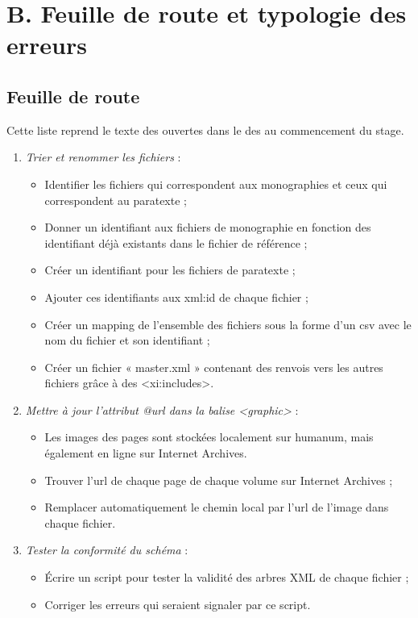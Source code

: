 \renewcommand{\thesection}{B.1}
\chapter{B. Feuille de route et typologie des erreurs}

\section{Feuille de route}
\label{ann:feuille_route}

Cette liste reprend le texte des \issues{} ouvertes dans le \gitlab{} des \odm{} au commencement du stage.

\begin{enumerate}
        \item \textit{Trier et renommer les fichiers} :
    \begin{itemize}
        \item  Identifier les fichiers qui correspondent aux monographies et ceux qui correspondent au paratexte ;
        \item  Donner un identifiant aux fichiers de monographie en fonction des identifiant déjà existants dans le fichier de référence ;
        \item  Créer un identifiant pour les fichiers de paratexte ;
        \item  Ajouter ces identifiants aux xml:id de chaque fichier ;
        \item  Créer un mapping de l’ensemble des fichiers sous la forme d’un csv avec le nom du fichier et son identifiant ;
        \item  Créer un fichier « master.xml » contenant des renvois vers les autres fichiers grâce à des <xi:includes>.
    \end{itemize}

    \item \textit{ Mettre à jour l’attribut @url dans la balise <graphic>} :
    \begin{itemize}
        \item  Les images des pages sont stockées localement sur humanum, mais également en ligne sur Internet Archives.
        \item  Trouver l’url de chaque page de chaque volume sur Internet Archives ;
        \item  Remplacer automatiquement le chemin local par l’url de l’image dans chaque fichier.
    \end{itemize}

    \item \textit{Tester la conformité du schéma} :
    \begin{itemize}
        \item  Écrire un script pour tester la validité des arbres XML de chaque fichier ;
        \item  Corriger les erreurs qui seraient signaler par ce script.
    \end{itemize}


\end{enumerate}
